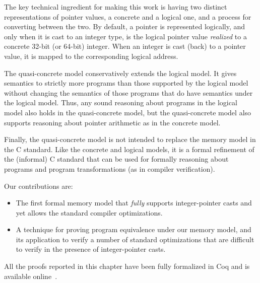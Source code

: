 The key technical ingredient for making this work is having two
distinct representations of pointer values, a concrete and a logical one,
and a process for converting between the two.
By default, a pointer is represented logically, and only when it is
cast to an integer type, is the logical pointer value
\emph{realized} to a concrete 32-bit (or 64-bit) integer.
When an integer is cast (back) to a pointer value, 
it is mapped to the corresponding logical address.

The quasi-concrete model conservatively extends the logical model.  It
gives semantics to strictly more programs than those supported by the
logical model without changing the semantics of those programs that do
have semantics under the logical model. Thus, any sound reasoning
about programs in the logical model also holds in the quasi-concrete
model, but the quasi-concrete model also supports reasoning about
pointer arithmetic as in the concrete model.

Finally, the quasi-concrete model is not intended to replace the
memory model in the C standard. Like the concrete and logical models,
it is a formal refinement of the (informal) C standard that can be
used for formally reasoning about programs and program transformations
(as in compiler verification).

\medskip \noindent
Our contributions are:
\begin{itemize}
\item The first formal memory model that \emph{fully} supports
  integer-pointer casts and yet allows the standard compiler
  optimizations.
\item A technique for proving program equivalence under our memory
model, and its application to verify a number of standard optimizations
that are difficult to verify in the presence of integer-pointer casts.
\end{itemize}

All the proofs reported in this chapter have been fully formalized in Coq and is available
online~\cite{kang-phd-thesis-web}.

%
%
%
%


